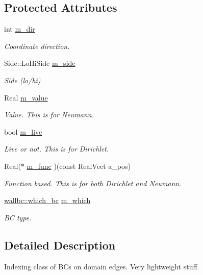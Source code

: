\subsection*{Protected Attributes}
\begin{DoxyCompactItemize}
\item 
int \hyperlink{classwall__bc_a6bb629a9b240f4c7d1fb8349ca8558c3}{m\+\_\+dir}
\begin{DoxyCompactList}\small\item\em Coordinate direction. \end{DoxyCompactList}\item 
Side\+::\+Lo\+Hi\+Side \hyperlink{classwall__bc_a340501f2dce2b3161dc734209d0b6c33}{m\+\_\+side}
\begin{DoxyCompactList}\small\item\em Side (lo/hi) \end{DoxyCompactList}\item 
Real \hyperlink{classwall__bc_a9bddac65830de0c43950d9a0499084ea}{m\+\_\+value}
\begin{DoxyCompactList}\small\item\em Value. This is for Neumann. \end{DoxyCompactList}\item 
bool \hyperlink{classwall__bc_a5d870d14553da786d941c904a2a07d60}{m\+\_\+live}
\begin{DoxyCompactList}\small\item\em Live or not. This is for Dirichlet. \end{DoxyCompactList}\item 
Real($\ast$ \hyperlink{classwall__bc_a16c88bd2a7d2ca3a4e78c465466991c9}{m\+\_\+func} )(const Real\+Vect a\+\_\+pos)
\begin{DoxyCompactList}\small\item\em Function based. This is for both Dirichlet and Neumann. \end{DoxyCompactList}\item 
\hyperlink{namespacewallbc_ac79598e478fbcdc07082173cc75d4d99}{wallbc\+::which\+\_\+bc} \hyperlink{classwall__bc_a2feb06799222d5a01407fd273dffaf26}{m\+\_\+which}
\begin{DoxyCompactList}\small\item\em BC type. \end{DoxyCompactList}\end{DoxyCompactItemize}


\subsection{Detailed Description}
Indexing class of B\+Cs on domain edges. Very lightweight stuff. 

